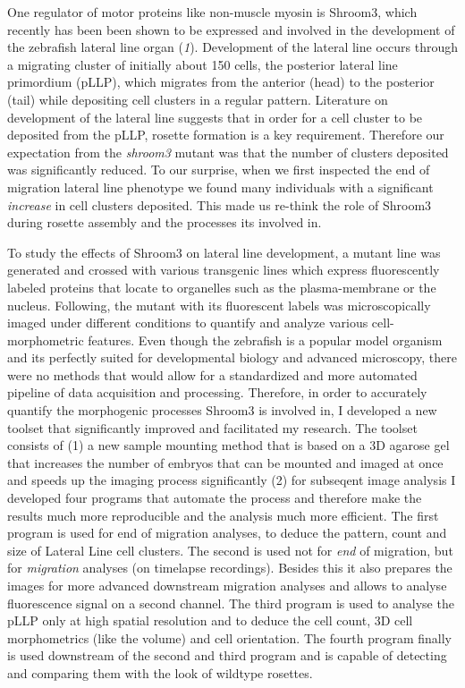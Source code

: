 \documentclass[10pt, b5paper, singlespacinge, twoside]{reedthesis} %
\theoremstyle{definition}
\theoremstyle{definition}
\theoremstyle{definition}
\theoremstyle{remark}
\begin{document}
One regulator of motor proteins like non-muscle myosin is Shroom3, which recently has been been shown to be expressed and involved in the development of the zebrafish lateral line organ (\emph{1}). Development of the lateral line occurs through a migrating cluster of initially about 150 cells, the posterior lateral line primordium (pLLP), which migrates from the anterior (head) to the posterior (tail) while depositing cell clusters in a regular pattern. Literature on development of the lateral line suggests that in order for a cell cluster to be deposited from the pLLP, rosette formation is a key requirement. Therefore our expectation from the \emph{shroom3} mutant was that the number of clusters deposited was significantly reduced. To our surprise, when we first inspected the end of migration lateral line phenotype we found many individuals with a significant \emph{increase} in cell clusters deposited. This made us re-think the role of Shroom3 during rosette assembly and the processes its involved in.

To study the effects of Shroom3 on lateral line development, a mutant line was generated and crossed with various transgenic lines which express fluorescently labeled proteins that locate to organelles such as the plasma-membrane or the nucleus. Following, the mutant with its fluorescent labels was microscopically imaged under different conditions to quantify and analyze various cell-morphometric features. Even though the zebrafish is a popular model organism and its perfectly suited for developmental biology and advanced microscopy, there were no methods that would allow for a standardized and more automated pipeline of data acquisition and processing. Therefore, in order to accurately quantify the morphogenic processes Shroom3 is involved in, I developed a new toolset that significantly improved and facilitated my research. The toolset consists of (1) a new sample mounting method that is based on a 3D agarose gel that increases the number of embryos that can be mounted and imaged at once and speeds up the imaging process significantly (2) for subseqent image analysis I developed four programs that automate the process and therefore make the results much more reproducible and the analysis much more efficient. The first program is used for end of migration analyses, to deduce the pattern, count and size of Lateral Line cell clusters. The second is used not for \emph{end} of migration, but for \emph{migration} analyses (on timelapse recordings). Besides this it also prepares the images for more advanced downstream migration analyses and allows to analyse fluorescence signal on a second channel. The third program is used to analyse the pLLP only at high spatial resolution and to deduce the cell count, 3D cell morphometrics (like the volume) and cell orientation. The fourth program finally is used downstream of the second and third program and is capable of detecting and comparing them with the look of wildtype rosettes.
\end{document}
